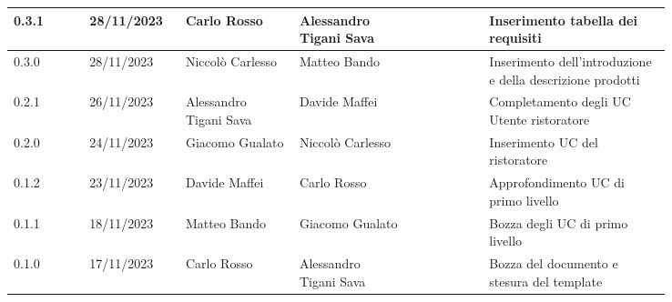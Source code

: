 {\begin{longtable}{p{0.10\linewidth}p{0.10\linewidth}p{0.15\linewidth}p{0.15\linewidth}p{0.10\linewidth}p{0.24\linewidth}}
	\hline
	0.3.1	& 28/11/2023	& Carlo Rosso			& Alessandro Tigani Sava &	& Inserimento tabella dei requisiti			\\
	\hline
	0.3.0	& 28/11/2023	& Niccolò Carlesso		& Matteo Bando			&	& Inserimento dell'introduzione e della descrizione prodotti \\
	\hline
	0.2.1	& 26/11/2023	& Alessandro Tigani Sava & Davide Maffei		&	& Completamento degli UC Utente ristoratore	\\
	\hline
	0.2.0	& 24/11/2023	& Giacomo Gualato		& Niccolò Carlesso		&	& Inserimento UC del ristoratore			\\
	\hline
	0.1.2	& 23/11/2023	& Davide Maffei			& Carlo Rosso			&	& Approfondimento UC di primo livello		\\
	\hline
	0.1.1	& 18/11/2023	& Matteo Bando			& Giacomo Gualato		&	& Bozza degli UC di primo livello			\\
	\hline
	0.1.0	& 17/11/2023	& Carlo Rosso			& Alessandro Tigani Sava &	& Bozza del documento e stesura del template \\
\end{longtable}
}
